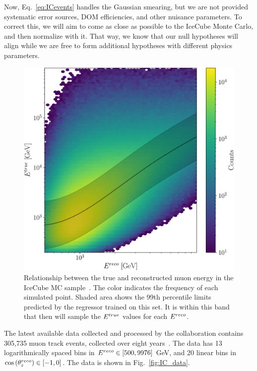 Now, Eq.~\ref{eq:ICevents} handles the Gaussian smearing, but we are not provided systematic error sources, DOM efficiencies, and other nuisance parameters. To correct this,
we will aim to come as close as possible to the IceCube Monte Carlo, and then normalize with it. That way, we know that our null hypotheses will align while we are free to form additional hypotheses with different 
physics parameters.


\begin{figure}[ht]
    \begin{center}
       \includegraphics[width=0.7\linewidth]{figures/IC_MC_gpr.pdf}
    \end{center}
    \caption{Relationship between the true and reconstructed muon energy in the IceCube MC sample~\cite{IC2016}.
    The color indicates the frequency of each simulated point.
    Shaded area shows the 99th percentile limits predicted by the regressor trained on this set. It is within this band 
    that then will sample the $E^{true}$ values for each $E^{reco}$.}\label{fig:IC_MC_gpr}
 \end{figure}

The latest available data collected and processed by the collaboration contains 305,735 muon track events, collected over eight years~\cite{IC2020}. 
The data has 13 logarithmically spaced bins in $E^{reco} \in [500,9976]$ \si{\GeV}, and 20 linear bins in $\cos{(\theta_z^{reco})} \in [-1,0]$. The data is shown in Fig.~\ref{fig:IC_data}.

